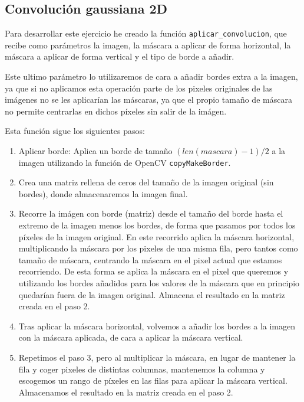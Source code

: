 \documentclass[12pt, spanish]{article}
\begin{document}
\subsection{Convolución gaussiana 2D}

Para desarrollar este ejercicio he creado la función \texttt{aplicar\_convolucion}, que recibe como parámetros la imagen, la máscara a aplicar de forma horizontal, la máscara a aplicar de forma vertical y el tipo de borde a añadir.

Este ultimo parámetro lo utilizaremos de cara a añadir bordes extra a la imagen, ya que si no aplicamos esta operación parte de los pixeles originales de las imágenes no se les aplicarían las máscaras, ya que el propio tamaño de máscara no permite centrarlas en dichos píxeles sin salir de la imágen.


Esta función sigue los siguientes pasos:

\begin{enumerate}
	\item Aplicar borde: Aplica un borde de tamaño $(len(mascara) - 1) / 2$ a la imagen utilizando la función de OpenCV \texttt{copyMakeBorder}.
	\item Crea una matriz rellena de ceros del tamaño de la imagen original (sin bordes), donde almacenaremos la imagen final.
	\item Recorre la imágen con borde (matriz) desde el tamaño del borde hasta el extremo de la imagen menos los bordes, de forma que pasamos por todos los píxeles de la imagen original. En este recorrido aplica la máscara horizontal, multiplicando la máscara por los pixeles de una misma fila, pero tantos como tamaño de máscara, centrando la máscara en el pixel actual que estamos recorriendo. De esta forma se aplica la máscara en el pixel que queremos y utilizando los bordes añadidos para los valores de la máscara que en principio quedarían fuera de la imagen original. Almacena el resultado en la matriz creada en el paso 2.
	\item Tras aplicar la máscara horizontal, volvemos a añadir los bordes a la imagen con la máscara aplicada, de cara a aplicar la máscara vertical.
	\item Repetimos el paso 3, pero al multiplicar la máscara, en lugar de mantener la fila y coger pixeles de distintas columnas, mantenemos la columna y escogemos un rango de píxeles en las filas para aplicar la máscara vertical. Almacenamos el resultado en la matriz creada en el paso 2.
\end{enumerate}
\end{document}
